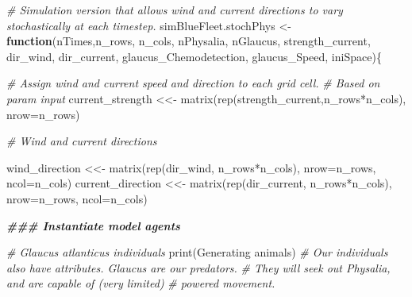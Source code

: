 \documentclass[
]{article}
\newenvironment{Shaded}{\begin{snugshade}}{\end{snugshade}}
\newcommand{\AttributeTok}[1]{\textcolor[rgb]{0.77,0.63,0.00}{#1}}
\newcommand{\CommentTok}[1]{\textcolor[rgb]{0.56,0.35,0.01}{\textit{#1}}}
\newcommand{\ControlFlowTok}[1]{\textcolor[rgb]{0.13,0.29,0.53}{\textbf{#1}}}
\newcommand{\DocumentationTok}[1]{\textcolor[rgb]{0.56,0.35,0.01}{\textbf{\textit{#1}}}}
\newcommand{\FunctionTok}[1]{\textcolor[rgb]{0.00,0.00,0.00}{#1}}
\newcommand{\NormalTok}[1]{#1}
\newcommand{\OtherTok}[1]{\textcolor[rgb]{0.56,0.35,0.01}{#1}}
\newcommand{\SpecialCharTok}[1]{\textcolor[rgb]{0.00,0.00,0.00}{#1}}
\newcommand{\StringTok}[1]{\textcolor[rgb]{0.31,0.60,0.02}{#1}}
\begin{document}
\begin{Shaded}
\begin{Highlighting}[]
\CommentTok{\# Simulation version that allows wind and current directions to vary stochastically at each timestep.}
\NormalTok{simBlueFleet.stochPhys }\OtherTok{\textless{}{-}} \ControlFlowTok{function}\NormalTok{(nTimes,n\_rows, n\_cols, nPhysalia, nGlaucus,}
\NormalTok{                                   strength\_current,}
\NormalTok{                                   dir\_wind, dir\_current,}
\NormalTok{                                   glaucus\_Chemodetection, glaucus\_Speed, iniSpace)\{}
  
  \CommentTok{\# Assign wind and current speed and direction to each grid cell.}
  \CommentTok{\# Based on param input}
\NormalTok{  current\_strength }\OtherTok{\textless{}\textless{}{-}} \FunctionTok{matrix}\NormalTok{(}\FunctionTok{rep}\NormalTok{(strength\_current,n\_rows}\SpecialCharTok{*}\NormalTok{n\_cols), }
                              \AttributeTok{nrow=}\NormalTok{n\_rows)}
  
  \CommentTok{\# Wind and current directions}
  
\NormalTok{  wind\_direction }\OtherTok{\textless{}\textless{}{-}} \FunctionTok{matrix}\NormalTok{(}\FunctionTok{rep}\NormalTok{(dir\_wind, n\_rows}\SpecialCharTok{*}\NormalTok{n\_cols), }
                            \AttributeTok{nrow=}\NormalTok{n\_rows, }\AttributeTok{ncol=}\NormalTok{n\_cols)}
\NormalTok{  current\_direction }\OtherTok{\textless{}\textless{}{-}} \FunctionTok{matrix}\NormalTok{(}\FunctionTok{rep}\NormalTok{(dir\_current, n\_rows}\SpecialCharTok{*}\NormalTok{n\_cols), }
                               \AttributeTok{nrow=}\NormalTok{n\_rows, }\AttributeTok{ncol=}\NormalTok{n\_cols)}
  
  
  \DocumentationTok{\#\#\# Instantiate model agents}
  
  \CommentTok{\# Glaucus atlanticus individuals}
  \FunctionTok{print}\NormalTok{(}\StringTok{\textquotesingle{}Generating animals\textquotesingle{}}\NormalTok{)}
  \CommentTok{\# Our individuals also have attributes. Glaucus are our predators.}
  \CommentTok{\# They will seek out Physalia, and are capable of (very limited)}
  \CommentTok{\# powered movement. }
  

\end{Highlighting}
\end{Shaded}
\end{document}
